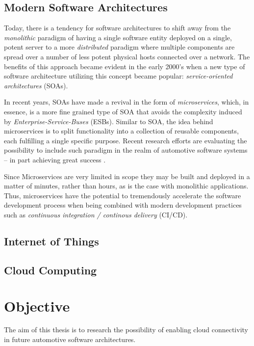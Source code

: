 \subsection{Modern Software Architectures}
Today, there is a tendency for software architectures to shift away from the \emph{monolithic} paradigm of having a single software entity deployed on a single, potent server to a more \emph{distributed} paradigm where multiple components are spread over a number of less potent physical hosts connected over a network.
The benefits of this approach became evident in the early 2000's when a new type of software architecture utilizing this concept became popular: \emph{service-oriented architectures} (SOAs).

In recent years, SOAs have made a revival in the form of \emph{microservices}, which, in essence, is a more fine grained type of SOA that avoids the complexity induced by \emph{Enterprise-Service-Buses} (ESBs). Similar to SOA, the idea behind microservices is to split functionality into a collection of reusable components, each fulfilling a single specific purpose. Recent research efforts are evaluating the possibility to include such paradigm in the realm of automotive software systems -- in part achieving great success \cite{berger2017containerized}. 

Since Microservices are very limited in scope they may be built and deployed in a matter of minutes, rather than hours, as is the case with monolithic applications. Thus, microservices have the potential to tremendously accelerate the software development process when being combined with modern development practices such as \emph{continuous integration / continous delivery} (CI/CD).

\subsection{Internet of Things}


\subsection{Cloud Computing}


%
%
%
%
%
%
%
%
%
%

\section{Objective}

The aim of this thesis is to research the possibility of enabling cloud connectivity in future automotive software architectures.
 
